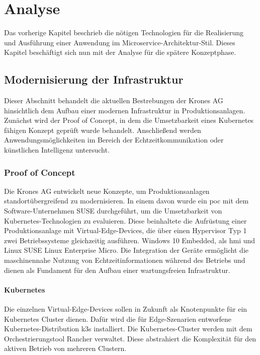 \chapter{Analyse}

Das vorherige Kapitel beschrieb die nötigen Technologien für die Realisierung und Ausführung einer Anwendung im Microservice-Architektur-Stil.
Dieses Kapitel beschäftigt sich nun mit der Analyse für die spätere Konzeptphase.

\section{Modernisierung der Infrastruktur}\label{moderninfra}
Dieser Abschnitt behandelt die aktuellen Bestrebungen der Krones AG hinsichtlich dem Aufbau einer modernen Infrastruktur in Produktionsanlagen. 
Zunächst wird der Proof of Concept, in dem die Umsetzbarkeit eines Kubernetes fähigen Konzept geprüft wurde behandelt. 
Anschließend werden Anwendungsmöglichkeiten im Bereich der Echtzeitkommunikation oder künstlichen Intelligenz untersucht. 

\subsection{Proof of Concept}
Die Krones AG entwickelt neue Konzepte, um Produktionsanlagen standortübergreifend zu modernisieren. 
In einem davon wurde ein \ac{poc} mit dem Software-Unternehmen SUSE durchgeführt, um die Umsetzbarkeit von Kubernetes-Technologien zu evaluieren. 
Diese beinhaltete die Aufrüstung einer Produktionsanlage mit Virtual-Edge-Devices, 
die über einen Hypervisor Typ 1 zwei Betriebssysteme gleichzeitig ausführen. Windows 10 Embedded, als \ac{hmi} und Linux SUSE Linux Enterprise Micro. 
Die Integration der Geräte ermöglicht die maschinennahe Nutzung von Echtzeitinformationen während des Betriebs und dienen als Fundament für den Aufbau einer wartungsfreien Infrastruktur.

\subsubsection{Kubernetes}
Die einzelnen Virtual-Edge-Devices sollen in Zukunft als Knotenpunkte für ein Kubernetes Cluster dienen. 
Dafür wird die für Edge-Szenarien entworfene Kubernetes-Distribution k3s installiert. 
Die Kubernetes-Cluster werden mit dem Orchestrierungstool Rancher verwaltet. 
Diese abstrahiert die Komplexität für den aktiven Betrieb von mehreren Clustern.


